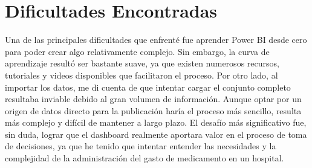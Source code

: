 \documentclass{article}
\begin{document}
\section{Dificultades Encontradas}
	
Una de las principales dificultades que enfrenté fue aprender Power BI desde cero para poder crear algo relativamente complejo. Sin embargo, la curva de aprendizaje resultó ser bastante suave, ya que existen numerosos recursos, tutoriales y videos disponibles que facilitaron el proceso. Por otro lado, al importar los datos, me di cuenta de que intentar cargar el conjunto completo resultaba inviable debido al gran volumen de información. Aunque optar por un origen de datos directo para la publicación haría el proceso más sencillo, resulta más complejo y difícil de mantener a largo plazo. El desafío más significativo fue, sin duda, lograr que el dashboard realmente aportara valor en el proceso de toma de decisiones, ya que he tenido que intentar entender las necesidades y la complejidad de la administración del gasto de medicamento en un hospital.

	
\end{document}
